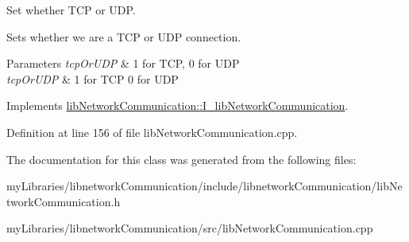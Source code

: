 Set whether T\+CP or U\+DP. 

Sets whether we are a T\+CP or U\+DP connection.


\begin{DoxyParams}{Parameters}
{\em tcp\+Or\+U\+DP} & 1 for T\+CP, 0 for U\+DP\\
\hline
{\em tcp\+Or\+U\+DP} & 1 for T\+CP 0 for U\+DP \\
\hline
\end{DoxyParams}


Implements \mbox{\hyperlink{classlibNetworkCommunication_1_1I__libNetworkCommunication_a66c9c4992979e7ccc7a2575a21ef3bf0}{lib\+Network\+Communication\+::\+I\+\_\+lib\+Network\+Communication}}.



Definition at line 156 of file lib\+Network\+Communication.\+cpp.



The documentation for this class was generated from the following files\+:\begin{DoxyCompactItemize}
\item 
my\+Libraries/libnetwork\+Communication/include/libnetwork\+Communication/lib\+Network\+Communication.\+h\item 
my\+Libraries/libnetwork\+Communication/src/lib\+Network\+Communication.\+cpp\end{DoxyCompactItemize}
